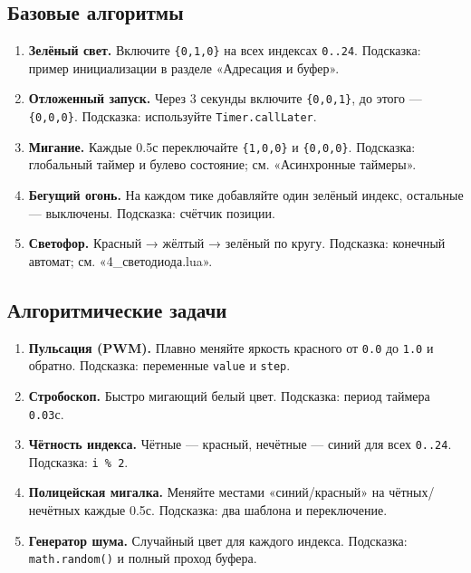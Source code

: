 \documentclass[a4paper,12pt]{article}
\begin{document}
\subsection{Базовые алгоритмы}
\begin{enumerate}
  \item \textbf{Зелёный свет.} Включите \verb|{0,1,0}| на всех индексах \verb|0..24|. Подсказка: пример инициализации в разделе «Адресация и буфер».
  \item \textbf{Отложенный запуск.} Через 3 секунды включите \verb|{0,0,1}|, до этого — \verb|{0,0,0}|. Подсказка: используйте \verb|Timer.callLater|.
  \item \textbf{Мигание.} Каждые 0.5с переключайте \verb|{1,0,0}| и \verb|{0,0,0}|. Подсказка: глобальный таймер и булево состояние; см. «Асинхронные таймеры».
  \item \textbf{Бегущий огонь.} На каждом тике добавляйте один зелёный индекс, остальные — выключены. Подсказка: счётчик позиции.
  \item \textbf{Светофор.} Красный → жёлтый → зелёный по кругу. Подсказка: конечный автомат; см. «4\_светодиода.lua».
\end{enumerate}
\subsection{Алгоритмические задачи}
\begin{enumerate}[resume]
  \item \textbf{Пульсация (PWM).} Плавно меняйте яркость красного от \verb|0.0| до \verb|1.0| и обратно. Подсказка: переменные \verb|value| и \verb|step|.
  \item \textbf{Стробоскоп.} Быстро мигающий белый цвет. Подсказка: период таймера \verb|0.03|с.
  \item \textbf{Чётность индекса.} Чётные — красный, нечётные — синий для всех \verb|0..24|. Подсказка: \verb|i % 2|.
  \item \textbf{Полицейская мигалка.} Меняйте местами «синий/красный» на чётных/нечётных каждые 0.5с. Подсказка: два шаблона и переключение.
  \item \textbf{Генератор шума.} Случайный цвет для каждого индекса. Подсказка: \verb|math.random()| и полный проход буфера.
\end{enumerate}
\end{document}
